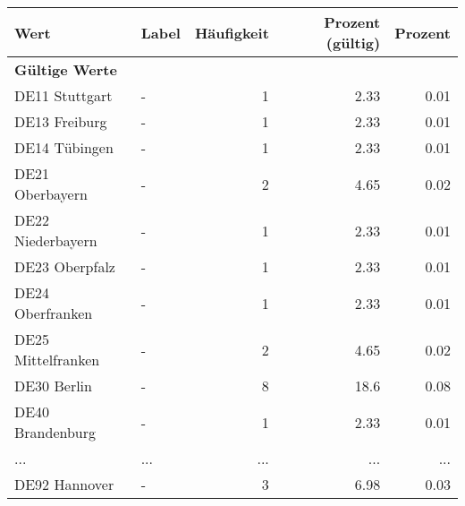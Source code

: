      \begin{longtable}{Xlrrr}
     \toprule
     \textbf{Wert} & \textbf{Label} & \textbf{Häufigkeit} & \textbf{Prozent (gültig)} & \textbf{Prozent} \\
     \endhead
     \midrule
     \multicolumn{5}{l}{\textbf{Gültige Werte}}\\
        \multicolumn{1}{X}{DE11 Stuttgart} & - & \num{1} & \num[round-mode=places,round-precision=2]{2.33} & \num[round-mode=places,round-precision=2]{0.01} \\
        \multicolumn{1}{X}{DE13 Freiburg} & - & \num{1} & \num[round-mode=places,round-precision=2]{2.33} & \num[round-mode=places,round-precision=2]{0.01} \\
        \multicolumn{1}{X}{DE14 Tübingen} & - & \num{1} & \num[round-mode=places,round-precision=2]{2.33} & \num[round-mode=places,round-precision=2]{0.01} \\
        \multicolumn{1}{X}{DE21 Oberbayern} & - & \num{2} & \num[round-mode=places,round-precision=2]{4.65} & \num[round-mode=places,round-precision=2]{0.02} \\
        \multicolumn{1}{X}{DE22 Niederbayern} & - & \num{1} & \num[round-mode=places,round-precision=2]{2.33} & \num[round-mode=places,round-precision=2]{0.01} \\
        \multicolumn{1}{X}{DE23 Oberpfalz} & - & \num{1} & \num[round-mode=places,round-precision=2]{2.33} & \num[round-mode=places,round-precision=2]{0.01} \\
        \multicolumn{1}{X}{DE24 Oberfranken} & - & \num{1} & \num[round-mode=places,round-precision=2]{2.33} & \num[round-mode=places,round-precision=2]{0.01} \\
        \multicolumn{1}{X}{DE25 Mittelfranken} & - & \num{2} & \num[round-mode=places,round-precision=2]{4.65} & \num[round-mode=places,round-precision=2]{0.02} \\
        \multicolumn{1}{X}{DE30 Berlin} & - & \num{8} & \num[round-mode=places,round-precision=2]{18.6} & \num[round-mode=places,round-precision=2]{0.08} \\
        \multicolumn{1}{X}{DE40 Brandenburg} & - & \num{1} & \num[round-mode=places,round-precision=2]{2.33} & \num[round-mode=places,round-precision=2]{0.01} \\
       ... & ... & ... & ... & ... \\
        \multicolumn{1}{X}{DE92 Hannover} & - & \num{3} & \num[round-mode=places,round-precision=2]{6.98} & \num[round-mode=places,round-precision=2]{0.03} \\

\end{longtable}
